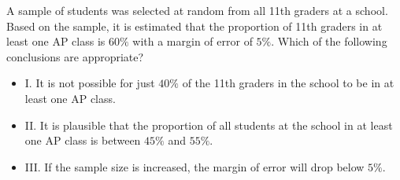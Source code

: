 \vspace{0.75em}


\vspace{2em}
\newpage

\noindent\markforreview
\vspace{1em}

A sample of students was selected at random from all 11th graders at a school. Based on the sample, it is estimated that the proportion of 11th graders in at least one AP class is \(60\%\) with a margin of error of \(5\%\). Which of the following conclusions are appropriate?

\begin{itemize}
\item I. It is not possible for just \(40\%\) of the 11th graders in the school to be in at least one AP class.
\item II. It is plausible that the proportion of all students at the school in at least one AP class is between \(45\%\) and \(55\%\).
\item III. If the sample size is increased, the margin of error will drop below \(5\%\).
\end{itemize}

\vspace{0.75em}


\vspace{2em}
\newpage
